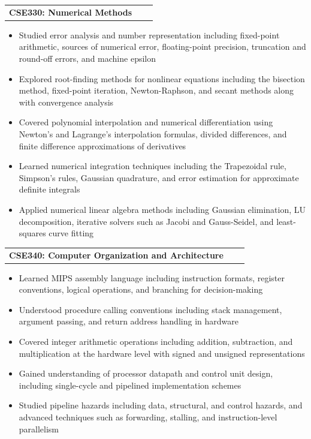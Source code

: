 \documentclass[a4paper,12pt]{article}
\makeatletter
\newenvironment{joblong}[2]
    {
    \begin{tabularx}{\linewidth}{@{}l X r@{}}
    \textbf{#1} & \hfill &  #2 \\[3.75pt]
    \end{tabularx}
    \begin{minipage}[t]{\linewidth}
    \begin{itemize}[nosep,after=\strut, leftmargin=1em, itemsep=3pt,label=--]
    }
    {
    \end{itemize}
    \end{minipage}    
    }
\makeatother
\begin{document}
\begin{joblong}{CSE330: Numerical Methods}{}
    \item Studied error analysis and number representation including fixed-point arithmetic, sources of numerical error, floating-point precision, truncation and round-off errors, and machine epsilon
    \item Explored root-finding methods for nonlinear equations including the bisection method, fixed-point iteration, Newton-Raphson, and secant methods along with convergence analysis
    \item Covered polynomial interpolation and numerical differentiation using Newton's and Lagrange's interpolation formulas, divided differences, and finite difference approximations of derivatives
    \item Learned numerical integration techniques including the Trapezoidal rule, Simpson's rules, Gaussian quadrature, and error estimation for approximate definite integrals
    \item Applied numerical linear algebra methods including Gaussian elimination, LU decomposition, iterative solvers such as Jacobi and Gauss-Seidel, and least-squares curve fitting
\end{joblong}

\begin{joblong}{CSE340: Computer Organization and Architecture}{}
    \item Learned MIPS assembly language including instruction formats, register conventions, logical operations, and branching for decision-making
    \item Understood procedure calling conventions including stack management, argument passing, and return address handling in hardware
    \item Covered integer arithmetic operations including addition, subtraction, and multiplication at the hardware level with signed and unsigned representations
    \item Gained understanding of processor datapath and control unit design, including single-cycle and pipelined implementation schemes
    \item Studied pipeline hazards including data, structural, and control hazards, and advanced techniques such as forwarding, stalling, and instruction-level parallelism
\end{joblong}
\end{document}
